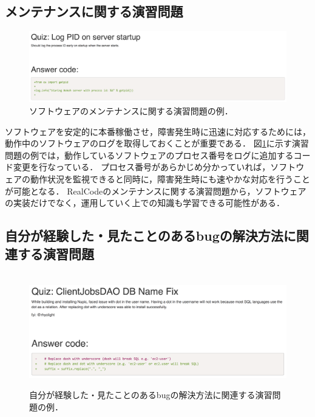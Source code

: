 \subsection{メンテナンスに関する演習問題}

\begin{figure}[t]
	\centering
  \includegraphics[width=1.0\columnwidth]{20190107-lab-study-maintenance-exercise.png}
  \caption{ソフトウェアのメンテナンスに関する演習問題の例．}
  \label{fig:lab-study-eg-maintenance}
\end{figure}

ソフトウェアを安定的に本番稼働させ，障害発生時に迅速に対応するためには，動作中のソフトウェアのログを取得しておくことが重要である．
図\ref{fig:lab-study-eg-maintenance}に示す演習問題の例では，動作しているソフトウェアのプロセス番号をログに追加するコード変更を行なっている．
プロセス番号があらかじめ分かっていれば，ソフトウェアの動作状況を監視できると同時に，障害発生時にも速やかな対応を行うことが可能となる．
RealCodeのメンテナンスに関する演習問題から，ソフトウェアの実装だけでなく，運用していく上での知識も学習できる可能性がある．

\subsection{自分が経験した・見たことのあるbugの解決方法に関連する演習問題}

\begin{figure}[t]
　\centering
　\includegraphics[width=1.0\columnwidth]{20190107-lab-study-experience-exercise.png}
  \caption{自分が経験した・見たことのあるbugの解決方法に関連する演習問題の例．}
  \label{fig:lab-study-eg-experience}
\end{figure}

